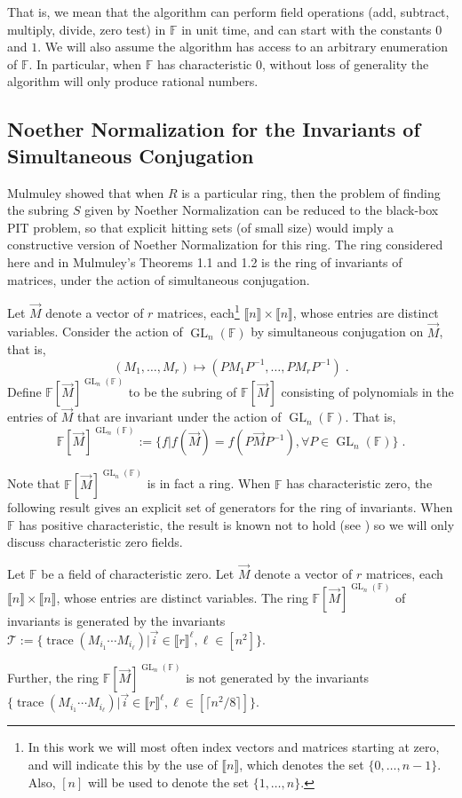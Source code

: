 \documentclass[letterpaper,11pt]{article}
\numberwithin{equation}{section}
\theoremstyle{plain}
\theoremstyle{remark}
\newcommand{\zr}[1]{{\llbracket {#1}\rrbracket}}
\DeclareMathOperator{\tr}{trace}
\DeclareMathOperator{\GL}{GL}
\newcommand{\F}{\mathbb{F}}
\newcommand{\cT}{\mathcal{T}}
\newcommand{\eqdef}{:=}
\begin{document}
That is, we mean that the algorithm can perform field operations (add, subtract, multiply, divide, zero test) in $\F$ in unit time, and can start with the constants $0$ and $1$.  We will also assume the algorithm has access to an arbitrary enumeration of $\F$.  In particular, when $\F$ has characteristic 0, without loss of generality the algorithm will only produce rational numbers.

\subsection{Noether Normalization for the Invariants of Simultaneous Conjugation}\label{sec:NNL}

Mulmuley showed that when $R$ is a particular ring, then the problem of finding the subring $S$ given by Noether Normalization can be reduced to the black-box PIT problem, so that explicit hitting sets (of small size) would imply a constructive version of Noether Normalization for this ring.  The ring considered here and in Mulmuley's Theorems 1.1 and 1.2 is the ring of invariants of matrices, under the action of simultaneous conjugation.

\begin{definition}
	Let $\vec{M}$ denote a vector of $r$ matrices, each\footnote{In this work we will most often index vectors and matrices starting at zero, and will indicate this by the use of $\zr{n}$, which denotes the set $\{0,\ldots,n-1\}$.  Also, $[n]$ will be used to denote the set $\{1,\ldots,n\}$.} $\zr{n}\times\zr{n}$, whose entries are distinct variables.  Consider the action of $\GL_n(\F)$ by simultaneous conjugation on $\vec{M}$, that is, \[(M_1,\ldots,M_r)\mapsto (PM_1P^{-1},\ldots,PM_rP^{-1})\;.\]
	Define $\F[\vec{M}]^{\GL_n(\F)}$ to be the subring of $\F[\vec{M}]$ consisting of polynomials in the entries of $\vec{M}$ that are invariant under the action of $\GL_n(\F)$.  That is, \[\F[\vec{M}]^{\GL_n(\F)}\eqdef \{f|f(\vec{M})=f(P\vec{M}P^{-1}), \forall P\in \GL_n(\F)\}\;.\]
\end{definition}

Note that $\F[\vec{M}]^{\GL_n(\F)}$ is in fact a ring.  When $\F$ has characteristic zero, the following result gives an explicit set of generators for the ring of invariants.  When $\F$ has positive characteristic, the result is known not to hold (see \cite[]{kraft2000classical}) so we will only discuss characteristic zero fields.

\begin{theorem}
	\label{generatinginvariants}
	Let $\F$ be a field of characteristic zero. Let $\vec{M}$ denote a vector of $r$ matrices, each $\zr{n}\times\zr{n}$, whose entries are distinct variables.  The ring $\F[\vec{M}]^{\GL_n(\F)}$ of invariants is generated by the invariants
	$\cT\eqdef\{\tr(M_{i_1}\cdots M_{i_\ell})| \vec{i}\in\zr{r}^\ell,\ell\in[n^2]\}$.
	
	Further, the ring $\F[\vec{M}]^{\GL_n(\F)}$ is not generated by the invariants
	$\{\tr(M_{i_1}\cdots M_{i_\ell})| \vec{i}\in\zr{r}^\ell,\ell\in[\lceil n^2/8\rceil]\}$.
\end{theorem}
\end{document}
